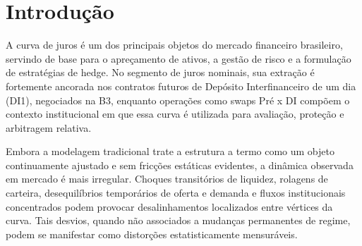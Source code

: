 \documentclass[fleqn]{rbfin}
\begin{document}
\begin{abstract}
	O mercado de juros futuros (DI) apresenta distorções geradas por fluxo de ordens. Este artigo propõe uma estratégia de arbitragem estatística do ruído microestrutural da curva DI (2021-2026), interpolada via \textit{Flat Forward} 252. Aplicamos a Análise de Componentes Principais (PCA) para neutralizar a dinâmica macroeconómica, operando a reversão à média do resíduo estocástico via \textit{z-score} (60 dias). No período \textit{out-of-sample} (2025-2026), os resultados evidenciam forte dependência espacial: a aplicação generalizada falha devido à não-estacionariedade nas pontas, mas nota-se altamente rentável na região central da curva. Utilizando o vértice M20 como estudo de caso, o modelo confirmou a captura da anomalia, gerando lucro absoluto, \textit{payoff} assimétrico e resiliência em testes de robustez. Conclui-se que a estratégia extrai \textit{alpha} descorrelacionado, mantendo o portefólio protegido do risco direcional da taxa Selic.
	
	\textbf{Palavras-chave:} Curvas DI; Arbitragem estatística; PCA; Reversão à média; DI1. \\
	\textbf{Códigos JEL:} G12; G13; C63.
\end{abstract}



\section{Introdução}\label{sec-intro}

A curva de juros é um dos principais objetos do mercado financeiro brasileiro, servindo de base para o apreçamento de ativos, a gestão de risco e a formulação de estratégias de hedge. No segmento de juros nominais, sua extração é fortemente ancorada nos contratos futuros de Depósito Interfinanceiro de um dia (DI1), negociados na B3, enquanto operações como swaps Pré x DI compõem o contexto institucional em que essa curva é utilizada para avaliação, proteção e arbitragem relativa.

Embora a modelagem tradicional trate a estrutura a termo como um objeto continuamente ajustado e sem fricções estáticas evidentes, a dinâmica observada em mercado é mais irregular. Choques transitórios de liquidez, rolagens de carteira, desequilíbrios temporários de oferta e demanda e fluxos institucionais concentrados podem provocar desalinhamentos localizados entre vértices da curva. Tais desvios, quando não associados a mudanças permanentes de regime, podem se manifestar como distorções estatisticamente mensuráveis.
\end{document}
